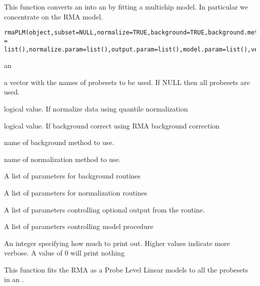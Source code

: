 \begin{Description}\relax
This function converts an  into an
 by fitting a multichip model. In particular we
concentrate on the RMA model.
\end{Description}
\begin{Usage}
\begin{verbatim}
rmaPLM(object,subset=NULL,normalize=TRUE,background=TRUE,background.method="RMA.2",normalize.method="quantile",background.param = list(),normalize.param=list(),output.param=list(),model.param=list(),verbosity.level=0)
\end{verbatim}
\end{Usage}
\begin{Arguments}
\begin{ldescription}
\item[\code{object}] an 
\item[\code{subset}] a vector with the names of probesets to be used. If NULL
then all probesets are used.
\item[\code{normalize}] logical value. If  normalize data using
quantile normalization
\item[\code{background}] logical value. If  background correct
using RMA background correction
\item[\code{background.method}] name of background method to use.
\item[\code{normalize.method}] name of normalization method to use.
\item[\code{background.param}] A list of parameters for background routines
\item[\code{normalize.param}] A list of parameters for normalization
routines
\item[\code{output.param}] A list of parameters controlling optional output
from the routine.
\item[\code{model.param}] A list of parameters controlling model procedure
\item[\code{verbosity.level}] An integer specifying how much to print
out. Higher values indicate more verbose. A value of 0 will print nothing
\end{ldescription}
\end{Arguments}
\begin{Details}\relax
This function fits the RMA as a Probe Level Linear models to all the probesets in
an .
\end{Details}
